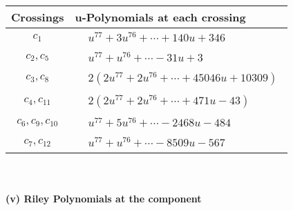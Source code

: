 \documentclass[1p]{elsarticle_modified}
\theoremstyle{definition}
\begin{document}
\begin{tabular}{m{50pt}|m{274pt}}
Crossings & \hspace{64pt}u-Polynomials at each crossing \\
\hline $$\begin{aligned}c_{1}\end{aligned}$$&$\begin{aligned}
&u^{77}+3 u^{76}+\cdots+140 u+346
\end{aligned}$\\
\hline $$\begin{aligned}c_{2},c_{5}\end{aligned}$$&$\begin{aligned}
&u^{77}+u^{76}+\cdots-31 u+3
\end{aligned}$\\
\hline $$\begin{aligned}c_{3},c_{8}\end{aligned}$$&$\begin{aligned}
&2(2 u^{77}+2 u^{76}+\cdots+45046 u+10309)
\end{aligned}$\\
\hline $$\begin{aligned}c_{4},c_{11}\end{aligned}$$&$\begin{aligned}
&2(2 u^{77}+2 u^{76}+\cdots+471 u-43)
\end{aligned}$\\
\hline $$\begin{aligned}c_{6},c_{9},c_{10}\end{aligned}$$&$\begin{aligned}
&u^{77}+5 u^{76}+\cdots-2468 u-484
\end{aligned}$\\
\hline $$\begin{aligned}c_{7},c_{12}\end{aligned}$$&$\begin{aligned}
&u^{77}+u^{76}+\cdots-8509 u-567
\end{aligned}$\\
\hline
\end{tabular}\\~\\
\newpage\renewcommand{\arraystretch}{1}
\flushleft \textbf{(v) Riley Polynomials at the component}\newline \\
\end{document}
